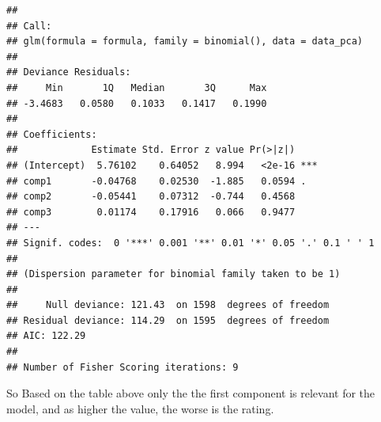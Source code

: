 \documentclass[]{article}
\newenvironment{Shaded}{\begin{snugshade}}{\end{snugshade}}
\newcommand{\KeywordTok}[1]{\textcolor[rgb]{0.13,0.29,0.53}{\textbf{{#1}}}}
\newcommand{\DataTypeTok}[1]{\textcolor[rgb]{0.13,0.29,0.53}{{#1}}}
\newcommand{\DecValTok}[1]{\textcolor[rgb]{0.00,0.00,0.81}{{#1}}}
\newcommand{\StringTok}[1]{\textcolor[rgb]{0.31,0.60,0.02}{{#1}}}
\newcommand{\NormalTok}[1]{{#1}}
\begin{document}
\begin{Shaded}
\end{Shaded}

\begin{verbatim}
## 
## Call:
## glm(formula = formula, family = binomial(), data = data_pca)
## 
## Deviance Residuals: 
##     Min       1Q   Median       3Q      Max  
## -3.4683   0.0580   0.1033   0.1417   0.1990  
## 
## Coefficients:
##             Estimate Std. Error z value Pr(>|z|)    
## (Intercept)  5.76102    0.64052   8.994   <2e-16 ***
## comp1       -0.04768    0.02530  -1.885   0.0594 .  
## comp2       -0.05441    0.07312  -0.744   0.4568    
## comp3        0.01174    0.17916   0.066   0.9477    
## ---
## Signif. codes:  0 '***' 0.001 '**' 0.01 '*' 0.05 '.' 0.1 ' ' 1
## 
## (Dispersion parameter for binomial family taken to be 1)
## 
##     Null deviance: 121.43  on 1598  degrees of freedom
## Residual deviance: 114.29  on 1595  degrees of freedom
## AIC: 122.29
## 
## Number of Fisher Scoring iterations: 9
\end{verbatim}

So Based on the table above only the the first component is relevant for
the model, and as higher the value, the worse is the rating.
\end{document}

